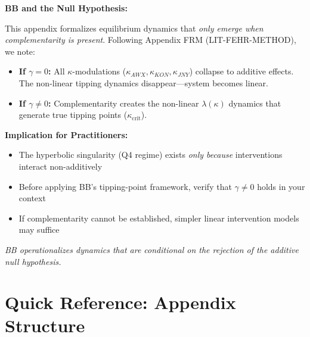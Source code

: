 \documentclass[11pt, a4paper]{article}
\begin{document}

\begin{tcolorbox}[colback=red!5!white, colframe=red!75!black,
    title=\textbf{Methodological Note: Exclusion Principle (Appendix FRM)}]

\textbf{BB and the Null Hypothesis:}

This appendix formalizes equilibrium dynamics that \textit{only emerge when complementarity is present}.
Following Appendix FRM (LIT-FEHR-METHOD), we note:

\begin{itemize}[nosep]
    \item \textbf{If $\gamma = 0$:} All $\kappa$-modulations ($\kappa_{AWX}, \kappa_{KON}, \kappa_{JNY}$) collapse to additive effects. The non-linear tipping dynamics disappear---system becomes linear.
    \item \textbf{If $\gamma \neq 0$:} Complementarity creates the non-linear $\lambda(\kappa)$ dynamics that generate true tipping points ($\kappa_{\text{crit}}$).
\end{itemize}

\medskip
\textbf{Implication for Practitioners:}
\begin{itemize}[nosep]
    \item The hyperbolic singularity (Q4 regime) exists \textit{only because} interventions interact non-additively
    \item Before applying BB's tipping-point framework, verify that $\gamma \neq 0$ holds in your context
    \item If complementarity cannot be established, simpler linear intervention models may suffice
\end{itemize}

\textit{BB operationalizes dynamics that are conditional on the rejection of the additive null hypothesis.}
\end{tcolorbox}


\section*{Quick Reference: Appendix Structure}
\end{document}
